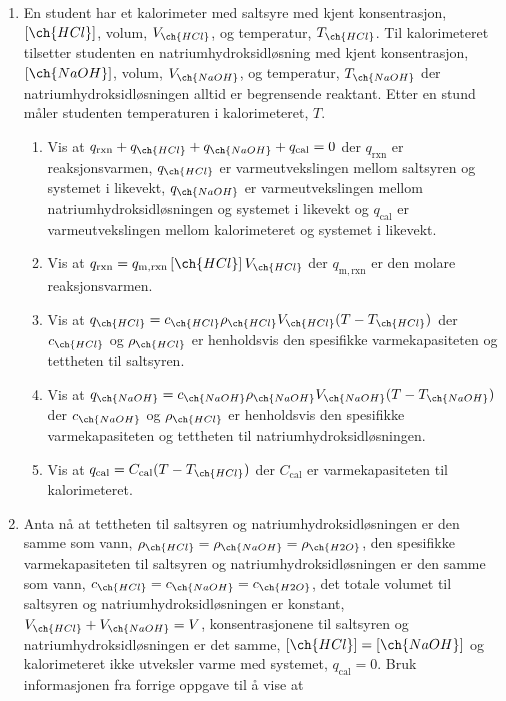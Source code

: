 \begin{enumerate}[label=\alph*)]
		\item En student har et kalorimeter med saltsyre med kjent konsentrasjon, $\left[\ch{HCl}\right]$, volum, $V_{\ch{HCl}}$, og temperatur, $T_{\ch{HCl}}$.
		Til kalorimeteret tilsetter studenten en natriumhydroksidløsning med kjent konsentrasjon, $\left[\ch{NaOH}\right]$, volum, $V_{\ch{NaOH}}$, og temperatur, 	$T_{\ch{NaOH}}$ der natriumhydroksidløsningen alltid er begrensende reaktant.
		Etter en stund måler studenten temperaturen i kalorimeteret, $T$.
		\begin{enumerate}[label=\roman*)]
			\item Vis at $q_\mathrm{rxn} + q_{\ch{HCl}} + q_{\ch{NaOH}} + q_\mathrm{cal} = 0$ der $q_\mathrm{rxn}$ er reaksjonsvarmen, $q_{\ch{HCl}}$ er varmeutvekslingen mellom saltsyren og systemet i likevekt, $q_{\ch{NaOH}}$ er varmeutvekslingen mellom natriumhydroksidløsningen og systemet i likevekt og $q_\mathrm{cal}$ er varmeutvekslingen mellom kalorimeteret og systemet i likevekt.
			\item Vis at $q_\mathrm{rxn}=q_\mathrm{m, rxn} \left[\ch{HCl}\right] V_{\ch{HCl}}$ der $q_\mathrm{m, rxn}$ er den molare reaksjonsvarmen.
			\item Vis at $q_{\ch{HCl}}=c_{\ch{HCl}}\rho_{\ch{HCl}}V_{\ch{HCl}}(T - T_{\ch{HCl}})$ der $c_{\ch{HCl}}$ og $\rho_{\ch{HCl}}$ er henholdsvis den spesifikke varmekapasiteten og tettheten til saltsyren.
			\item Vis at $q_{\ch{NaOH}}=c_{\ch{NaOH}}\rho_{\ch{NaOH}}V_{\ch{NaOH}}(T - T_{\ch{NaOH}})$ der $c_{\ch{NaOH}}$ og $\rho_{\ch{HCl}}$ er henholdsvis den spesifikke varmekapasiteten og tettheten til natriumhydroksidløsningen.
			\item Vis at $q_\mathrm{cal}=C_\mathrm{cal}(T - T_{\ch{HCl}})$ der $C_\mathrm{cal}$ er varmekapasiteten til kalorimeteret.
		\end{enumerate}
		\item Anta nå at tettheten til saltsyren og natriumhydroksidløsningen er den samme som vann, $\rho_{\ch{HCl}}=\rho_{\ch{NaOH}}=\rho_{\ch{H2O}}$, den spesifikke varmekapasiteten til saltsyren og natriumhydroksidløsningen er den samme som vann, $c_{\ch{HCl}}=c_{\ch{NaOH}}=c_{\ch{H2O}}$, det totale volumet til saltsyren og natriumhydroksidløsningen er konstant, $V_{\ch{HCl}} + V_{\ch{NaOH}} = V$, konsentrasjonene til saltsyren og natriumhydroksidløsningen er det samme, $\left[\ch{HCl}\right]=\left[\ch{NaOH}\right]$ og kalorimeteret ikke utveksler varme med systemet, $q_\mathrm{cal}=0$.
		Bruk informasjonen fra forrige oppgave til å vise at 

\end{enumerate}
